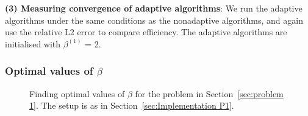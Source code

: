 \documentclass[final]{siamltex}
\begin{document}
{\bf (3) Measuring convergence of adaptive algorithms}: We run the
adaptive algorithms under the same conditions as the nonadaptive
algorithms, and again use the relative L2 error to compare
efficiency. The adaptive algorithms are initialised with $\beta^{(1)}$ = 2.


\subsubsection{Optimal values of $\beta$}\label{sec:Optimal values P1}

\begin{figure}[htb]
\centering
{}
\caption{Finding optimal values of $\beta$ for the problem in Section~\ref{sec:problem 1}. The setup is as in Section~\ref{sec:Implementation P1}.}
\label{fig:P1 opt beta}
\end{figure}
\end{document}

